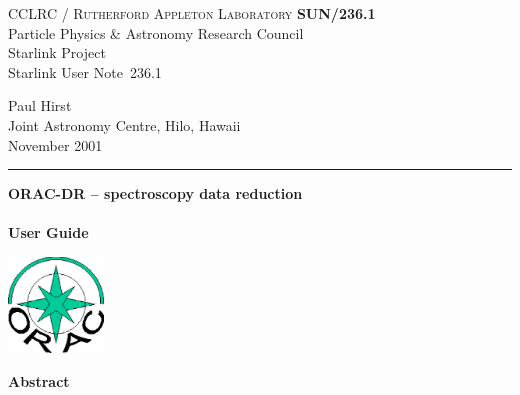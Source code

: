 \documentclass[twoside,11pt]{article}
\newcommand{\stardoccategory}  {Starlink User Note}
\newcommand{\stardocinitials}  {SUN}
\newcommand{\stardocnumber}    {236.1}
\newcommand{\stardocauthors}   {Paul Hirst \\
                                Joint Astronomy Centre, Hilo, Hawaii}
\newcommand{\stardocdate}      {November 2001}
\newcommand{\stardoctitle}     {ORAC-DR -- spectroscopy data reduction}
\newcommand{\stardocversion}   {}
\newcommand{\stardocmanual}    {User Guide}
\newcommand{\stardocname}{\stardocinitials /\stardocnumber}
\newenvironment{latexonly}{}{}
\renewcommand{\_}{\texttt{\symbol{95}}}
\begin{document}
\setcounter{secnumdepth}{5}
\thispagestyle{empty}

\begin{latexonly}
   CCLRC / \textsc{Rutherford Appleton Laboratory} \hfill \textbf{\stardocname}\\
   {\large Particle Physics \& Astronomy Research Council}\\
   {\large Starlink Project\\}
   {\large \stardoccategory\ \stardocnumber}
   \begin{flushright}
   \stardocauthors\\
   \stardocdate
   \end{flushright}
   \vspace{-4mm}
   \rule{\textwidth}{0.5mm}
   \vspace{5mm}
   \begin{center}
   {\Huge\textbf{\stardoctitle \\ [2.5ex]}}
   {\LARGE\textbf{\stardocversion \\ [4ex]}}
   {\Huge\textbf{\stardocmanual}}
   \end{center}
   \vspace{5mm}

\begin{center}
\includegraphics[width=1.0in]{sun236_logo.eps}
\end{center}

   \vspace{10mm}
   \begin{center}
      {\Large\textbf{Abstract}}
   \end{center}
\end{latexonly}
\end{document}
